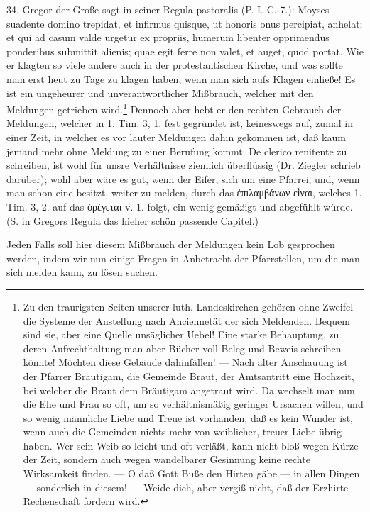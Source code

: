 34. Gregor der Große sagt in seiner Regula pastoralis (P. I. C. 7.): Moyses suadente domino trepidat, et infirmus quisque, ut honoris onus percipiat, anhelat; et qui ad casum valde urgetur ex propriis, humerum libenter opprimendus ponderibus submittit alienis; quae egit ferre non valet, et auget, quod portat. Wie er klagten so viele andere auch in der protestantischen Kirche, und
was sollte man erst heut zu Tage zu klagen haben, wenn man sich aufs Klagen einließe! Es ist ein ungeheurer und unverantwortlicher Mißbrauch, welcher mit den Meldungen getrieben wird.\footnote{Zu den traurigsten Seiten unserer luth. Landeskirchen gehören ohne Zweifel die Systeme der Anstellung nach Anciennetät der sich Meldenden. Bequem sind sie, aber eine Quelle unsäglicher Uebel! Eine starke Behauptung, zu deren Aufrechthaltung man aber Bücher voll Beleg und Beweis schreiben könnte! Möchten diese Gebäude dahinfällen! — Nach alter Anschauung ist der Pfarrer Bräutigam, die Gemeinde Braut, der Amtsantritt eine Hochzeit, bei welcher die Braut dem Bräutigam angetraut wird. Da wechselt man nun die Ehe und Frau so oft, um so verhältnismäßig geringer Ursachen willen, und so wenig männliche Liebe und Treue ist vorhanden, daß es kein Wunder ist, wenn auch die Gemeinden nichts mehr von weiblicher, treuer Liebe übrig haben. Wer sein Weib so leicht und oft verläßt, kann nicht bloß wegen Kürze der Zeit, sondern auch wegen wandelbarer Gesinnung keine rechte Wirksamkeit finden. — O daß Gott Buße den Hirten gäbe — in allen Dingen — sonderlich in diesem! — Weide dich, aber vergiß nicht, daß der Erzhirte Rechenschaft fordern wird.} Dennoch aber hebt er den rechten Gebrauch der Meldungen, welcher in 1. Tim. 3, 1. fest gegründet ist, keineswegs auf, zumal in einer Zeit, in welcher es vor lauter Meldungen dahin gekommen ist, daß kaum jemand mehr ohne Meldung zu einer Berufung kommt. De clerico renitente zu schreiben, ist wohl für unsre Verhältnisse ziemlich überflüssig (Dr. Ziegler schrieb darüber); wohl aber wäre es gut, wenn der Eifer, sich um eine Pfarrei, und, wenn man schon eine besitzt, weiter zu melden, durch das ἐπιλαμβάνων εἶναι, welches 1. Tim. 3, 2. auf das ὀρέγεται v. 1. folgt, ein wenig gemäßigt und abgefühlt würde. (S. in Gregors Regula das hieher schön passende Capitel.)

Jeden Falls soll hier diesem Mißbrauch der Meldungen kein Lob gesprochen werden, indem wir nun einige Fragen in Anbetracht der Pfarrstellen, um die man sich melden kann, zu lösen suchen.

